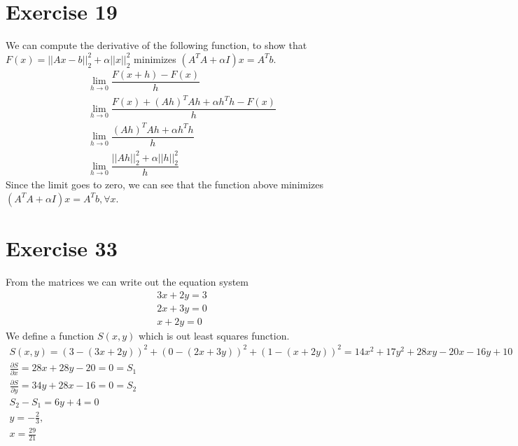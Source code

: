 \section{Exercise 19}
We can compute the derivative of the following function, to show that $F(x) = ||Ax - b||_2^2 + \alpha ||x||_2^2$ minimizes $(A^TA + \alpha I)x = A^Tb$.
\begin{gather*}
\lim_{h \to 0} \dfrac{F(x+h) - F(x)}{h} \\
\lim_{h \to 0} \dfrac{F(x) + (Ah)^T Ah + \alpha h^Th - F(x)}{h}\\
\lim_{h \to 0} \dfrac{(Ah)^T Ah + \alpha h^Th}{h}\\
\lim_{h \to 0} \dfrac{||Ah||_2^2 + \alpha ||h||_2^2}{h}
\end{gather*}
Since the limit goes to zero, we can see that the function above minimizes $(A^TA + \alpha I)x = A^Tb, \forall x$.
\section{Exercise 33}
From the matrices we can write out the equation system
\begin{gather*}
3x + 2y = 3 \\
2x + 3y = 0\\
x+ 2y = 0
\end{gather*}
We define a function $S(x,y)$ which is out least squares function.
\begin{gather*}
S(x,y) = \left( 3 - \left( 3x + 2y \right) \right)^2 + \left( 0- \left( 2x+3y \right) \right)^2 + \left( 1 - \left( x + 2y \right) \right)^2 = 
14 x^2 + 17 y^2 + 28xy -20x -16y + 10 \\
\frac{\partial S}{\partial x} = 28x + 28y -20 = 0 = S_1 \\
\frac{\partial S}{\partial y} = 34y + 28x -16 = 0 = S_2\\
S_2 - S_1 = 6y +4 =0\\
y = -\frac{2}{3},\\
x = \frac{29}{21}
\end{gather*}